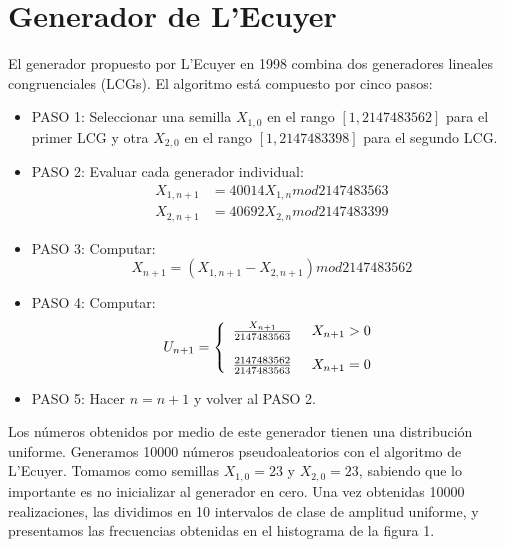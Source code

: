 \documentclass[10pt,journal,compsoc]{IEEEtran}
\begin{document}
\section{Generador de L'Ecuyer}
El generador propuesto por L'Ecuyer en 1998 combina dos generadores lineales congruenciales (LCGs).
El algoritmo est\'a compuesto por cinco pasos:
\begin{itemize}
 \item{PASO 1:} Seleccionar una semilla $X_{1,0}$ en el rango $[1,2147483562]$ para el primer LCG y otra $X_{2,0}$ en el rango $[1,2147483398]$ para el segundo LCG.\\
 \item{PASO 2:} Evaluar cada generador individual:
 \begin{align*}
  X_{1,n+1} &= 40014 X_{1,n} mod 2147483563\\
  X_{2,n+1} &= 40692 X_{2,n} mod 2147483399
 \end{align*}
 
 \item{PASO 3:} Computar:
 \begin{equation*}
  X_{n+1} = (X_{1,n+1} - X_{2,n+1}) mod 2147483562
 \end{equation*}
 
 \item{PASO 4:} Computar:
  \begin{equation*}
  \label{eq:f(t)}
  U_{n+1} = \left\{
  \begin{array}{rl}
	\frac{X_{n+1}}{2147483563} \hspace{0.5cm} X_{n+1} > 0\\\\
	\frac{2147483562}{2147483563} \hspace{0.5cm} X_{n+1} = 0\\
  \end{array} \right.
  \end{equation*}

 \item{PASO 5:} Hacer $n = n + 1$ y volver al PASO 2.
\end{itemize}

Los n\'umeros obtenidos por medio de este generador tienen una distribuci\'on uniforme.
Generamos 10000 n\'umeros pseudoaleatorios con el algoritmo de L'Ecuyer.  Tomamos como semillas $X_{1,0}=23$ y $X_{2,0}=23$, sabiendo que lo importante
es no inicializar al generador en cero.  Una vez obtenidas 10000 realizaciones, las dividimos en 10 intervalos de clase de amplitud uniforme, y 
presentamos las frecuencias obtenidas en el histograma de la figura 1.
\end{document}
